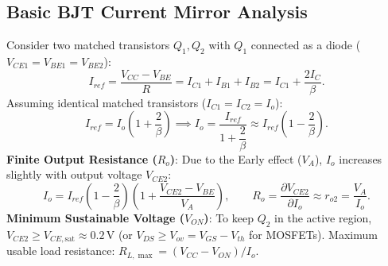 \documentclass[12pt,a4paper]{article}
\begin{document}
\subsection{Basic BJT Current Mirror Analysis}
Consider two matched transistors $Q_1, Q_2$ with $Q_1$ connected as a diode ($V_{CE1} = V_{BE1} = V_{BE2}$):
\[
I_{ref} = \frac{V_{CC} - V_{BE}}{R} = I_{C1} + I_{B1} + I_{B2} = I_{C1} + \frac{2I_C}{\beta}.
\]
Assuming identical matched transistors ($I_{C1} = I_{C2} = I_o$):
\[
I_{ref} = I_o \left(1 + \frac{2}{\beta}\right) \implies I_o = \frac{I_{ref}}{1 + \dfrac{2}{\beta}} \approx I_{ref}\left(1 - \frac{2}{\beta}\right).
\]
\textbf{Finite Output Resistance ($R_o$)}: Due to the Early effect ($V_A$), $I_o$ increases slightly with output voltage $V_{CE2}$:
\[
I_o = I_{ref}\left(1 - \frac{2}{\beta}\right)\left(1 + \frac{V_{CE2} - V_{BE}}{V_A}\right),\qquad R_o = \frac{\partial V_{CE2}}{\partial I_o} \approx r_{o2} = \frac{V_A}{I_o}.
\]
\textbf{Minimum Sustainable Voltage ($V_{ON}$)}: To keep $Q_2$ in the active region, $V_{CE2} \ge V_{CE,\mathrm{sat}} \approx 0.2\,\mathrm{V}$ (or $V_{DS} \ge V_{ov} = V_{GS} - V_{th}$ for MOSFETs). Maximum usable load resistance: $R_{L,\max} = (V_{CC} - V_{ON})/I_o$.
\end{document}
